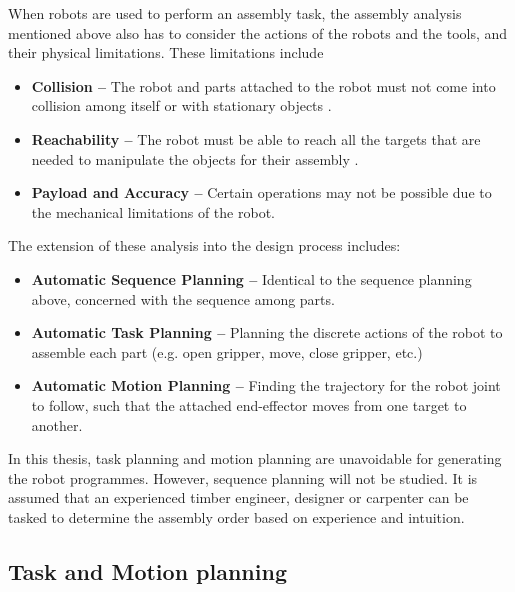 When robots are used to perform an assembly task, the assembly analysis mentioned above also has to consider the actions of the robots and the tools, and their physical limitations. These limitations include

\begin{itemize}
    \item \textbf{Collision --} The robot and parts attached to the robot must not come into collision among itself or with stationary objects .

	\item \textbf{Reachability --} The robot must be able to reach all the targets that are needed to manipulate the objects for their assembly .

	\item \textbf{Payload and Accuracy --} Certain operations may not be possible due to the mechanical limitations of the robot.
\end{itemize}

The extension of these analysis into the design process includes:

\begin{itemize}
	\item \textbf{Automatic Sequence Planning --} Identical to the sequence planning above, concerned with the sequence among parts.

	\item \textbf{Automatic Task Planning --} Planning the discrete actions of the robot to assemble each part (e.g. open gripper, move, close gripper, etc.) \parencite{homemdemelloTaskSequencePlanning1989}

	\item \textbf{Automatic Motion Planning --} Finding the trajectory for the robot joint to follow, such that the attached end-effector moves from one target to another. \parencite{lavallePlanningAlgorithms2006}
\end{itemize}

In this thesis, task planning and motion planning are unavoidable for generating the robot programmes. However, sequence planning will not be studied. It is assumed that an experienced timber engineer, designer or carpenter can be tasked to determine the assembly order based on experience and intuition.

\subsection{Task and Motion planning}
\label{subsection:challenges_task_motion_planning}

